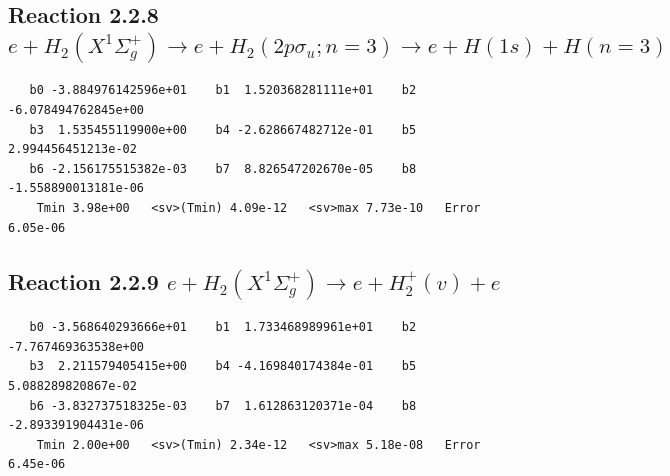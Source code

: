 \documentclass[12pt,dvipdfmx]{article}
\begin{document}
\newpage
\subsection{
Reaction 2.2.8 $e + H_2(X^1\Sigma_g^+) \rightarrow e + H_2(2p\sigma_u;n=3) \rightarrow e + H(1s) + H(n=3)$}














\begin{small}\begin{verbatim}
   b0 -3.884976142596e+01    b1  1.520368281111e+01    b2 -6.078494762845e+00
   b3  1.535455119900e+00    b4 -2.628667482712e-01    b5  2.994456451213e-02
   b6 -2.156175515382e-03    b7  8.826547202670e-05    b8 -1.558890013181e-06
    Tmin 3.98e+00   <sv>(Tmin) 4.09e-12   <sv>max 7.73e-10   Error 6.05e-06
\end{verbatim}\end{small}

\newpage
\subsection{
Reaction 2.2.9 $e + H_2(X^1\Sigma_g^+) \rightarrow e + H_2^+(v) + e$}














\begin{small}\begin{verbatim}
   b0 -3.568640293666e+01    b1  1.733468989961e+01    b2 -7.767469363538e+00
   b3  2.211579405415e+00    b4 -4.169840174384e-01    b5  5.088289820867e-02
   b6 -3.832737518325e-03    b7  1.612863120371e-04    b8 -2.893391904431e-06
    Tmin 2.00e+00   <sv>(Tmin) 2.34e-12   <sv>max 5.18e-08   Error 6.45e-06
\end{verbatim}\end{small}







\newpage
\end{document}

